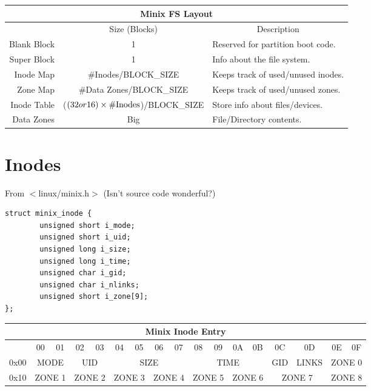 \small
\begin{tabular}{|r||c|p{3.5in}|}
\hline
\multicolumn{3}{|c|}{Minix FS Layout}
  \\ \hline\hline
\multicolumn{1}{|c||}{}
& \multicolumn{1}{c|}{Size (Blocks)}
& \multicolumn{1}{c|}{Description}
  \\ \hline
Blank Block & 1 & Reserved for partition boot code. \\ \hline
Super Block & 1 & Info about the file system. \\ \hline
Inode Map & \#Inodes/BLOCK\_SIZE &
  Keeps track of used/unused inodes. \\ \hline
Zone Map & \#Data Zones/BLOCK\_SIZE & 
  Keeps track of used/unused zones. \\ \hline
Inode Table & ($(32 or 16) \times {\rm \#Inodes}$)/{BLOCK\_SIZE} &
  Store info about files/devices. \\ \hline
Data Zones & Big  & File/Directory contents. \\ \hline
\end{tabular}
\normalsize

\section{Inodes}

From $<$linux/minix.h$>$ (Isn't source code wonderful?)

\begin{verbatim}
struct minix_inode {
        unsigned short i_mode;
        unsigned short i_uid;
        unsigned long i_size;
        unsigned long i_time;
        unsigned char i_gid;
        unsigned char i_nlinks;
        unsigned short i_zone[9];
};
\end{verbatim}

\begin{tabular}{|r||c|c|c|c|c|c|c|c||c|c|c|c|c|c|c|c|}
\hline
\multicolumn{17}{|c|}{Minix Inode Entry}
  \\ \hline\hline
 & 00 & 01 & 02 & 03 & 04 & 05 & 06 & 07 & 08 &
   09 & 0A & 0B & 0C & 0D & 0E & 0F \\ \hline
0x00 & \multicolumn{2}{c|}{MODE} & \multicolumn{2}{c|}{UID} &
   \multicolumn{4}{c||}{SIZE} & \multicolumn{4}{c|}{TIME} &
   GID & LINKS & \multicolumn{2}{c|}{ZONE 0} \\ \hline
0x10 & \multicolumn{2}{c|}{ZONE 1} & \multicolumn{2}{c|}{ZONE 2} &
   \multicolumn{2}{c|}{ZONE 3} & \multicolumn{2}{c||}{ZONE 4} &
   \multicolumn{2}{c|}{ZONE 5} & \multicolumn{2}{c|}{ZONE 6} &
   \multicolumn{2}{c|}{ZONE 7} & \multicolumn{2}{c|}{ZONE 8} \\ \hline
\end{tabular}

